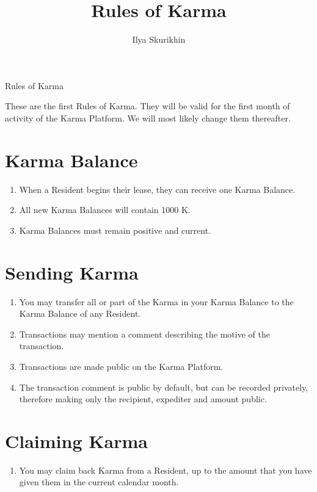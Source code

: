 \documentclass[12pt,a4paper]{article}
\author{Ilya Skurikhin}
\title{Rules of Karma}
\begin{document}
\begin{center}
{\Huge Rules of Karma}
\end{center}

\vspace{2cm}

These are the first Rules of Karma. They will be valid for the first month of activity of the Karma Platform. We will most likely change them thereafter.

\section{Karma Balance}

\begin{enumerate}
	\item When a Resident begins their lease, they can receive one Karma Balance.
	\item All new Karma Balances will contain 1000 K.
	\item Karma Balances must remain positive and current.
\end{enumerate}

\section{Sending Karma}

\begin{enumerate}
	\item You may transfer all or part of the Karma in your Karma Balance to the Karma Balance of any Resident. 
	\item Transactions may mention a comment describing the motive of the transaction.
	\item Transactions are made public on the Karma Platform. 
	\item The transaction comment is public by default, but can be recorded privately, therefore making only the recipient, expediter and amount public.
\end{enumerate}

\section{Claiming Karma}

\begin{enumerate}
	\item You may claim back Karma from a Resident, up to the amount that you have given them in the current calendar month.
\end{enumerate}
\end{document}
